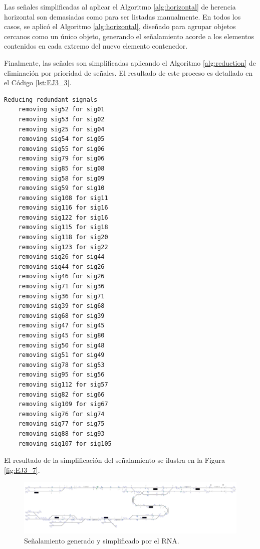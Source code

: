 	Las señales simplificadas al aplicar el Algoritmo \ref{alg:horizontal} de herencia horizontal son demasiadas como para ser listadas manualmente. En todos los casos, se aplicó el Algoritmo \ref{alg:horizontal}, diseñado para agrupar objetos cercanos como un único objeto, generando el señalamiento acorde a los elementos contenidos en cada extremo del nuevo elemento contenedor.
	
	Finalmente, las señales son simplificadas aplicando el Algoritmo \ref{alg:reduction} de eliminación por prioridad de señales. El resultado de este proceso es detallado en el Código \ref{lst:EJ3_3}.
	
	\begin{lstlisting}[language = {}, tabsize=4, basicstyle=\footnotesize\ttfamily, showspaces=false, showstringspaces=false, caption = Reducción de señalamiento por prioridad de señales, label = {lst:EJ3_3}]
	Reducing redundant signals
	removing sig52 for sig01
	removing sig53 for sig02
	removing sig25 for sig04
	removing sig54 for sig05
	removing sig55 for sig06
	removing sig79 for sig06
	removing sig85 for sig08
	removing sig58 for sig09
	removing sig59 for sig10
	removing sig108 for sig11
	removing sig116 for sig16
	removing sig122 for sig16
	removing sig115 for sig18
	removing sig118 for sig20
	removing sig123 for sig22
	removing sig26 for sig44
	removing sig44 for sig26
	removing sig46 for sig26
	removing sig71 for sig36
	removing sig36 for sig71
	removing sig39 for sig68
	removing sig68 for sig39
	removing sig47 for sig45
	removing sig45 for sig80
	removing sig50 for sig48
	removing sig51 for sig49
	removing sig78 for sig53
	removing sig95 for sig56
	removing sig112 for sig57
	removing sig82 for sig66
	removing sig109 for sig67
	removing sig76 for sig74
	removing sig77 for sig75
	removing sig88 for sig93
	removing sig107 for sig105
	\end{lstlisting}
	
	El resultado de la simplificación del señalamiento se ilustra en la Figura \ref{fig:EJ3_7}.
	
	\begin{figure}[H]
		\centering
		\includegraphics[width=1\textwidth]{resultados-obtenidos/ejemplo3/images/3_RNA.png}
		\centering\caption{Señalamiento generado y simplificado por el RNA.}
		\label{fig:EJ1_7}
	\end{figure}
	
